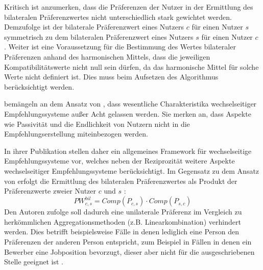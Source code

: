 Kritisch ist anzumerken, dass die Präferenzen der Nutzer in der Ermittlung des bilateralen Präferenzwertes nicht unterschiedlich stark gewichtet werden.
Demzufolge ist der bilaterale Präferenzwert eines Nutzers $c$ für einen Nutzer $s$ symmetrisch zu dem bilateralen Präferenzwert eines Nutzers $s$ für einen Nutzer $c$ \cite[S. 211]{pizzato:2010}.
Weiter ist eine Voraussetzung für die Bestimmung des Wertes bilateraler Präferenzen anhand des harmonischen Mittels, dass die jeweiligen Kompatibilitätswerte nicht null sein dürfen, da das harmonische Mittel für solche Werte nicht definiert ist.
Dies muss beim Aufsetzen des Algorithmus berücksichtigt werden.

\textcite[S. 40]{li:inproceedings} bemängeln an dem Ansatz von \textcite[S. 207ff.]{pizzato:2010}, dass wesentliche Charakteristika wechselseitiger Empfehlungssysteme außer Acht gelassen werden.
Sie merken an, dass Aspekte wie Passivität und die Endlichkeit von Nutzern nicht in die Empfehlungserstellung miteinbezogen werden.

In ihrer Publikation stellen \textcite[S. 38]{li:inproceedings} daher ein allgemeines Framework für wechselseitige Empfehlungssysteme vor, welches neben der Reziprozität weitere Aspekte wechselseitiger Empfehlungssysteme berücksichtigt.
Im Gegensatz zu dem Ansatz von \textcite[S. 207ff.]{pizzato:2010} erfolgt die Ermittlung des bilateralen Präferenzwertes als Produkt der Präferenzwerte zweier Nutzer $c$ und $s$ \cite[S. 710]{kumari:article}:
\begin{equation}\label{eq40}
    PW_{c,s}^{bil} = Comp(P_{c,s}) \cdot Comp(P_{s,c})
\end{equation}
Den Autoren zufolge soll dadurch eine unilaterale Präferenz im Vergleich zu herkömmlichen Aggregationsmethoden (z.B. Linearkombination) verhindert werden.
Dies betrifft beispielsweise Fälle in denen lediglich eine Person den Präferenzen der anderen Person entspricht, zum Beispiel in Fällen in denen ein Bewerber eine Jobposition bevorzugt, dieser aber nicht für die ausgeschriebenen Stelle geeignet ist \cite[S. 38]{li:inproceedings}.

